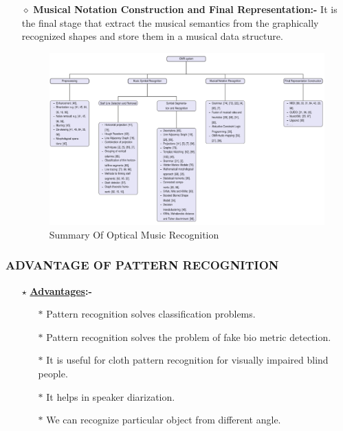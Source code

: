 \documentclass{beamer}
\begin{document}
\begin{frame}
\transboxin

\begin{itemize}
\item[$\diamond$]{\bf{Musical Notation Construction and Final Representation}:-}\pause
It is the final stage that extract the musical semantics from the graphically recognized shapes and store them in a musical data structure.\pause
\begin{figure}
    
    \includegraphics[width=.8\textwidth]{final stucture.jpg}
    \caption{Summary Of Optical Music Recognition}
\end{figure}
\end{itemize}
\end{frame}


\begin{frame}
\transsplithorizontalin

\frametitle{ADVANTAGE OF PATTERN RECOGNITION}
\begin{itemize}
\item[$\star$] {\bf{\underline{Advantages}}:-}\\ \pause
\begin{itemize}
\item[$\ast$] Pattern recognition solves classification problems. \pause
\item[$\ast$] Pattern recognition solves the problem of fake bio metric detection.\pause
\item[$\ast$] It is useful for cloth pattern recognition for visually impaired blind people. \pause
\item[$\ast$] It helps in speaker diarization.\pause
\item[$\ast$] We can recognize particular object from different angle.\pause
\end{itemize}
\end{itemize}
\end{frame}
\end{document}
